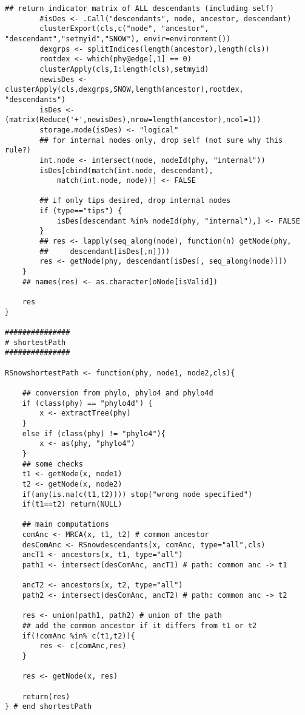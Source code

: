 \documentclass[11pt,letterpaper]{article}
\begin{document}
\begin{lstlisting}[style=MyR]
        ## return indicator matrix of ALL descendants (including self)
        #isDes <- .Call("descendants", node, ancestor, descendant)
        clusterExport(cls,c("node", "ancestor", "descendant","setmyid","SNOW"), envir=environment())
        dexgrps <- splitIndices(length(ancestor),length(cls))
        rootdex <- which(phy@edge[,1] == 0)
        clusterApply(cls,1:length(cls),setmyid)
        newisDes <- clusterApply(cls,dexgrps,SNOW,length(ancestor),rootdex,     "descendants")
        isDes <- (matrix(Reduce('+',newisDes),nrow=length(ancestor),ncol=1))
        storage.mode(isDes) <- "logical"
        ## for internal nodes only, drop self (not sure why this rule?)
        int.node <- intersect(node, nodeId(phy, "internal"))
        isDes[cbind(match(int.node, descendant),
            match(int.node, node))] <- FALSE

        ## if only tips desired, drop internal nodes
        if (type=="tips") {
            isDes[descendant %in% nodeId(phy, "internal"),] <- FALSE
        }
        ## res <- lapply(seq_along(node), function(n) getNode(phy,
        ##     descendant[isDes[,n]]))
        res <- getNode(phy, descendant[isDes[, seq_along(node)]])
    }
    ## names(res) <- as.character(oNode[isValid])

    res
}

###############
# shortestPath
###############

RSnowshortestPath <- function(phy, node1, node2,cls){

    ## conversion from phylo, phylo4 and phylo4d
    if (class(phy) == "phylo4d") {
        x <- extractTree(phy)
    }
    else if (class(phy) != "phylo4"){
        x <- as(phy, "phylo4")
    }
    ## some checks
    t1 <- getNode(x, node1)
    t2 <- getNode(x, node2)
    if(any(is.na(c(t1,t2)))) stop("wrong node specified")
    if(t1==t2) return(NULL)

    ## main computations
    comAnc <- MRCA(x, t1, t2) # common ancestor
    desComAnc <- RSnowdescendants(x, comAnc, type="all",cls)
    ancT1 <- ancestors(x, t1, type="all")
    path1 <- intersect(desComAnc, ancT1) # path: common anc -> t1

    ancT2 <- ancestors(x, t2, type="all")
    path2 <- intersect(desComAnc, ancT2) # path: common anc -> t2

    res <- union(path1, path2) # union of the path
    ## add the common ancestor if it differs from t1 or t2
    if(!comAnc %in% c(t1,t2)){
        res <- c(comAnc,res)
    }

    res <- getNode(x, res)

    return(res)
} # end shortestPath

\end{lstlisting}
\end{document}
